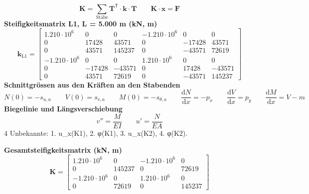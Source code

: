 \documentclass[11pt,a4paper]{article}
\begin{document}
\begin{equation*}
\mathbf{K} = \sum_{\text{Stäbe}} \mathbf{T}^{\mathsf{T}} \cdot \mathbf{k} \cdot \mathbf{T} \qquad \mathbf{K} \cdot \mathbf{x} = \mathbf{F}
\end{equation*}
\noindent\textbf{Steifigkeitsmatrix L1, L = 5.000 m (kN, m)}
\begin{equation*}
\mathbf{k}_{\text{L1}} = \begin{bmatrix} 1.210 \cdot 10^{6} & 0 & 0 & -1.210 \cdot 10^{6} & 0 & 0 \\ 0 & 17428 & 43571 & 0 & -17428 & 43571 \\ 0 & 43571 & 145237 & 0 & -43571 & 72619 \\ -1.210 \cdot 10^{6} & 0 & 0 & 1.210 \cdot 10^{6} & 0 & 0 \\ 0 & -17428 & -43571 & 0 & 17428 & -43571 \\ 0 & 43571 & 72619 & 0 & -43571 & 145237 \end{bmatrix}
\end{equation*}
\noindent\textbf{Schnittgrössen aus den Kräften an den Stabenden}
\begin{equation*}
N(0) = -s_{u,a} \qquad V(0) = s_{v,a} \qquad M(0) = -s_{\theta,a} \qquad \frac{\mathrm{d}N}{\mathrm{d}x} = -p_x \qquad \frac{\mathrm{d}V}{\mathrm{d}x} = p_y \qquad \frac{\mathrm{d}M}{\mathrm{d}x} = V - m
\end{equation*}
\noindent\textbf{Biegelinie und Längsverschiebung}
\begin{equation*}
v'' = \frac{M}{EI} \qquad u' = \frac{N}{EA}
\end{equation*}
4 Unbekannte: 1. u\_x(K1), 2. φ(K1), 3. u\_x(K2), 4. φ(K2).

\noindent\textbf{Gesamtsteifigkeitsmatrix (kN, m)}
\begin{equation*}
\mathbf{K} = \begin{bmatrix} 1.210 \cdot 10^{6} & 0 & -1.210 \cdot 10^{6} & 0 \\ 0 & 145237 & 0 & 72619 \\ -1.210 \cdot 10^{6} & 0 & 1.210 \cdot 10^{6} & 0 \\ 0 & 72619 & 0 & 145237 \end{bmatrix}
\end{equation*}
\end{document}
